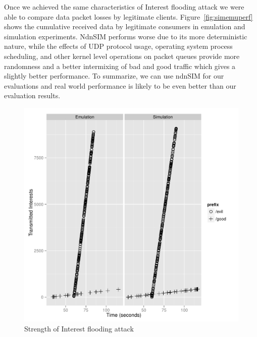Once we achieved the same characteristics of Interest flooding attack we were able to compare data packet losses by legitimate clients. Figure~\ref{fig:simemuperf} shows the cumulative received data by legitimate consumers in emulation and simulation experiments. NdnSIM performs worse due to its more deterministic nature, while the effects of UDP protocol usage, operating system process scheduling, and other kernel level operations on packet queues provide more randomness and a better intermixing of bad and good traffic which gives a slightly better performance. To summarize, we can use ndnSIM for our evaluations and real world performance is likely to be even better than our evaluation results.

\begin{figure}[htpb]
  \centering
  \includegraphics[scale=0.5]{figures/sim-emu-power.pdf}
  \caption{Strength of Interest flooding attack}
  \label{fig:simemupower}
\end{figure}

